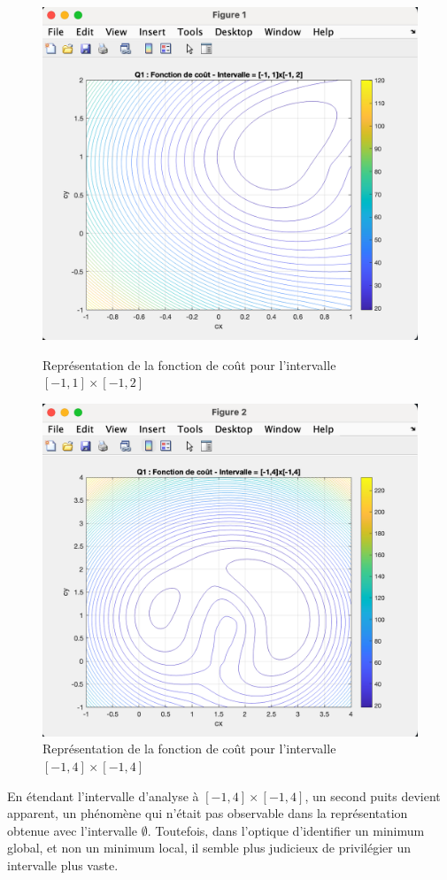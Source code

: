 \documentclass[12pt]{article}
\begin{document}
\begin{figure}[H]
    \centering
    \begin{minipage}[b]{0.45\textwidth}
        \centering
        \includegraphics[width=\textwidth]{Q1.2.png} 
        \caption{Représentation de la fonction de coût pour l'intervalle \([-1, 1] \times [-1, 2]\)}
    \end{minipage}
    \hfill
    \begin{minipage}[b]{0.45\textwidth}
        \centering
        \includegraphics[width=\textwidth]{Q1.1.png}
        \caption{Représentation de la fonction de coût pour l'intervalle \([-1, 4] \times [-1, 4]\)}
    \end{minipage}
\end{figure}
En étendant l’intervalle d’analyse à \([-1, 4] \times [-1, 4]\), un second puits devient apparent, un phénomène qui n’était pas observable dans la représentation obtenue avec l’intervalle \(\emptyset\). Toutefois, dans l’optique d’identifier un minimum global, et non un minimum local, il semble plus judicieux de privilégier un intervalle plus vaste.
\end{document}
